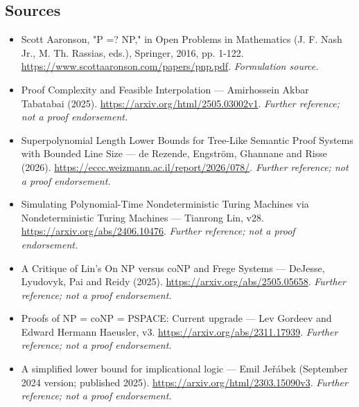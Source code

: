 \documentclass[11pt]{article}
\begin{document}
\subsection{Sources}
\begin{itemize}
\item[S1]Scott Aaronson, "P =? NP," in Open Problems in Mathematics (J. F. Nash Jr., M. Th. Rassias, eds.), Springer, 2016, pp. 1-122.
\url{https://www.scottaaronson.com/papers/pnp.pdf}.
\textit{Formulation source.}
\item[S2]Proof Complexity and Feasible Interpolation — Amirhossein Akbar Tabatabai (2025).
\url{https://arxiv.org/html/2505.03002v1}.
\textit{Further reference; not a proof endorsement.}
\item[S3]Superpolynomial Length Lower Bounds for Tree-Like Semantic Proof Systems with Bounded Line Size — de Rezende, Engström, Ghannane and Risse (2026).
\url{https://eccc.weizmann.ac.il/report/2026/078/}.
\textit{Further reference; not a proof endorsement.}
\item[S4]Simulating Polynomial-Time Nondeterministic Turing Machines via Nondeterministic Turing Machines — Tianrong Lin, v28.
\url{https://arxiv.org/abs/2406.10476}.
\textit{Further reference; not a proof endorsement.}
\item[S5]A Critique of Lin's On NP versus coNP and Frege Systems — DeJesse, Lyudovyk, Pai and Reidy (2025).
\url{https://arxiv.org/abs/2505.05658}.
\textit{Further reference; not a proof endorsement.}
\item[S6]Proofs of NP = coNP = PSPACE: Current upgrade — Lev Gordeev and Edward Hermann Haeusler, v3.
\url{https://arxiv.org/abs/2311.17939}.
\textit{Further reference; not a proof endorsement.}
\item[S7]A simplified lower bound for implicational logic — Emil Jeřábek (September 2024 version; published 2025).
\url{https://arxiv.org/html/2303.15090v3}.
\textit{Further reference; not a proof endorsement.}
\end{itemize}
\end{document}
